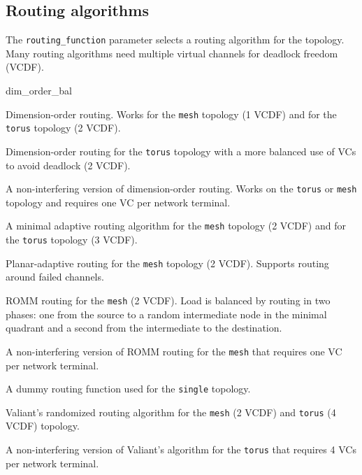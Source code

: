 \documentclass[11pt]{article}
\begin{document}
\subsection{Routing algorithms}
\label{sec:routing_algs}

The \texttt{routing\_function} parameter selects a routing algorithm
for the topology.  Many routing algorithms need multiple virtual
channels for deadlock freedom (VCDF).

\begin{opt_list}{dim\_order\_bal}

\item[dim\_order] Dimension-order routing.  Works for the
\texttt{mesh} topology (1 VCDF) and for the \texttt{torus} topology (2
VCDF).

\item[dim\_order\_bal] Dimension-order routing for the
\texttt{torus} topology with a more balanced use of VCs to
avoid deadlock (2 VCDF).

\item[dim\_order\_ni] A non-interfering version of
dimension-order routing.  Works on the \texttt{torus} or \texttt{mesh}
topology and requires one VC per network terminal.

\item[min\_adapt] A minimal adaptive routing algorithm for
the \texttt{mesh} topology (2 VCDF) and for the \texttt{torus}
topology (3 VCDF).

\item[planar\_adapt] Planar-adaptive routing for the
\texttt{mesh} topology (2 VCDF).  Supports routing around failed channels.

\item[romm] ROMM routing for the \texttt{mesh} (2 VCDF).
Load is balanced by routing in two phases: one from the source to a
random intermediate node in the minimal quadrant and a second from the
intermediate to the destination.

\item[romm\_ni] A non-interfering version of ROMM routing for
the \texttt{mesh} that requires one VC per network terminal.

\item[single] A dummy routing function used for the
\texttt{single} topology.

\item[valiant] Valiant's randomized routing algorithm for the
\texttt{mesh} (2 VCDF) and \texttt{torus} (4 VCDF) topology.

\item[valiant\_ni] A non-interfering version of Valiant's algorithm
for the \texttt{torus} that requires 4 VCs per network terminal.

\end{opt_list}
\end{document}
